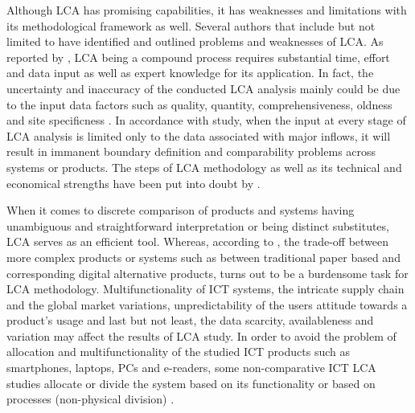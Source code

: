 \documentclass[conference]{IEEEtran}
\begin{document}
Although LCA has promising capabilities, it has weaknesses and limitations with its methodological framework as well. Several authors that include but not limited to \cite{joshi1999product, reap2008survey, owens1997life, finnveden1997valuation, arnold1993life, arnold1995environmental, hermann2007assessing} have identified and outlined problems and weaknesses of LCA. As reported by \cite{hermann2007assessing}, LCA being a compound process requires substantial time, effort and data input as well as expert knowledge for its application. In fact, the uncertainty and inaccuracy of the conducted LCA analysis mainly could be due to the input data factors such as quality, quantity, comprehensiveness, oldness  and site specificness \cite{curran2005international, reap2008survey}. In accordance with \cite{joshi1999product} study, when the input at every stage of LCA analysis is limited only to the data associated with major inflows, it will result in immanent boundary definition and comparability problems across systems or products. The steps of LCA methodology as well as its technical and economical strengths have been put into doubt by \cite{finnveden1997valuation, arnold1993life, arnold1995environmental}.

When  it  comes  to  discrete  comparison  of  products  and systems having  unambiguous  and  straightforward  interpretation  or  being distinct  substitutes,  LCA  serves  as  an  efficient tool.  Whereas, according  to  \cite{Bull201410, reap2008survey}, the  trade-off  between more complex products or systems such as between traditional  paper  based  and  corresponding  digital  alternative products, turns out to be a burdensome task for LCA methodology. Multifunctionality of  ICT  systems, the  intricate  supply  chain  and  the  global market variations, unpredictability of the users attitude towards a  product’s  usage  and  last  but  not  least,  the  data  scarcity, availableness  and  variation may affect the results of LCA study\cite{guldbrandsson2012opportunities, Bull201410, farrant2012environmental, enroth2009}. In order to avoid the problem of allocation and multifunctionality of the studied ICT products such as smartphones, laptops, PCs and e-readers, some non-comparative ICT LCA studies allocate or divide the system based on its functionality or based on processes (non-physical division) \cite{choi2006life,frey2006ecological,lu2006balancing, ekvall2001allocation}. 
\end{document}
